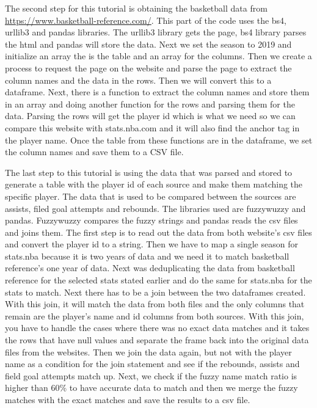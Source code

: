 \documentclass[10pt,twocolumn]{article}
\begin{document}
The second step for this tutorial is obtaining the basketball data from \url{https://www.basketball-reference.com/}. This part of the code uses the bs4, urllib3 and pandas libraries. The urllib3 library gets the page, bs4 library parses the html and pandas will store the data. Next we set the season to 2019 and initialize an array the is the table and an array for the columns. Then we create a process to request the page on the website and parse the page to extract the column names and the data in the rows. Then we will convert this to a dataframe. Next, there is a function to extract the column names and store them in an array and doing another function for the rows and parsing them for the data. Parsing the rows will get the player id which is what we need so we can compare this website with stats.nba.com and it will also find the anchor tag in the player name. Once the table from these functions are in the dataframe, we set the column names and save them to a CSV file.

The last step to this tutorial is using the data that was parsed and stored to generate a table with the player id of each source and make them matching the specific player. The data that is used to be compared between the sources are assists, filed goal attempts and rebounds. The libraries used are fuzzywuzzy and pandas. Fuzzywuzzy compares the fuzzy strings and pandas reads the csv files and joins them. The first step is to read out the data from both website's csv files and convert the player id to a string. Then we have to map a single season for stats.nba because it is two years of data and we need it to match basketball reference's one year of data. Next was deduplicating the data from basketball reference for the selected stats stated earlier and do the same for stats.nba for the stats to match. Next there has to be a join between the two dataframes created. With this join, it will match the data from both files and the only columns that remain are the player's name and id columns from both sources. With this join, you have to handle the cases where there was no exact data matches and it takes the rows that have null values and separate the frame back into the original data files from the websites. Then we join the data again, but not with the player name as a condition for the join statement and see if the rebounds, assists and field goal attempts match up. Next, we check if the fuzzy name match ratio is higher than 60\% to have accurate data to match and then we merge the fuzzy matches with the exact matches and save the results to a csv file. 
\end{document}
